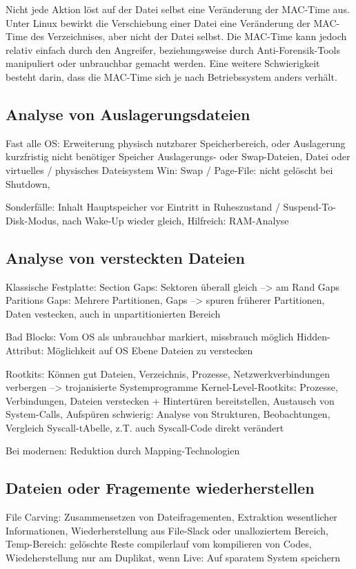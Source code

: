 Nicht jede Aktion löst auf der Datei selbst eine Veränderung der MAC-Time aus. Unter Linux bewirkt die Verschiebung einer Datei eine Veränderung der MAC-Time des Verzeichnises, aber nicht der Datei selbst. Die MAC-Time kann jedoch relativ einfach durch den Angreifer, beziehungsweise durch Anti-Forensik-Tools manipuliert oder unbrauchbar gemacht werden. Eine weitere Schwierigkeit besteht darin, dass die MAC-Time sich je nach Betriebssystem anders verhält.


\subsection{Analyse von Auslagerungsdateien}
Fast alle OS: Erweiterung physisch nutzbarer Speicherbereich, oder Auslagerung kurzfristig nicht benötiger Speicher
Auslagerungs- oder Swap-Dateien, Datei oder virtuelles / physisches Dateisystem
Win: Swap / Page-File: nicht gelöscht bei Shutdown, 

Sonderfälle: Inhalt Hauptspeicher vor Eintritt in Ruheszustand / Suspend-To-Disk-Modus, nach Wake-Up wieder gleich, Hilfreich: RAM-Analyse


\subsection{Analyse von versteckten Dateien}
Klassische Festplatte:
Section Gaps: Sektoren überall gleich --> am Rand Gaps
Paritions Gaps: Mehrere Partitionen, Gaps --> spuren früherer Partitionen, Daten vestecken, auch in unpartitionierten Bereich

Bad Blocks: Vom OS als unbrauchbar markiert, missbrauch möglich
Hidden-Attribut: Möglichkeit auf OS Ebene Dateien zu verstecken


Rootkits: Können gut Dateien, Verzeichnis, Prozesse, Netzwerkverbindungen verbergen --> trojanisierte Systemprogramme
Kernel-Level-Rootkits: Prozesse, Verbindungen, Dateien verstecken + Hintertüren bereitstellen, Austausch von System-Calls, Aufspüren schwierig: Analyse von Strukturen, Beobachtungen, Vergleich Syscall-tAbelle, z.T. auch Syscall-Code direkt verändert

Bei modernen: Reduktion durch Mapping-Technologien

\subsection{Dateien oder Fragemente wiederherstellen}
File Carving: Zusammensetzen von Dateifragementen, Extraktion wesentlicher Informationen, Wiederherstellung aus File-Slack oder unalloziertem Bereich, 
Temp-Bereich: gelöschte Reste compilerlauf vom kompilieren von Codes, Wiedeherstellung nur am Duplikat, wenn Live: Auf sparatem System speichern

